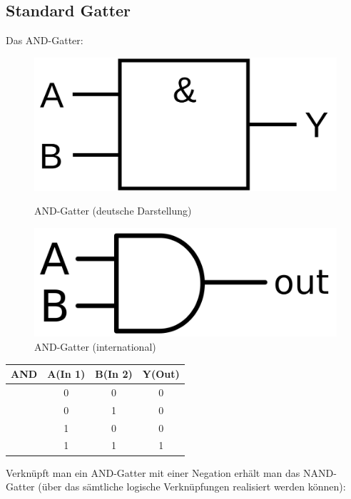 \documentclass[12pt,a4paper]{report}%
\numberwithin{equation}{section}
\numberwithin{equation}{subsection}
\begin{document}
	  \subsection{Standard Gatter}
	  Das AND-Gatter:
	  \begin{figure}[H] 
		\centering
		\begin{minipage}{.5\textwidth}
		  \centering
		  \captionsetup{justification=centering}
		  \includegraphics[width=0.6\linewidth]{AND.png}
		  \caption{AND-Gatter (deutsche Darstellung)}
		  \label{fig:and_de}
		\end{minipage}%
		\begin{minipage}{.5\textwidth}
		  \centering
		  \captionsetup{justification=centering}
		  \includegraphics[width=0.6\linewidth]{AND_int.png}
		  \caption{AND-Gatter (international)}
		  \label{fig:and_int}
		\end{minipage}
  \end{figure}
  \begin{table}[H]
	  \centering
	  \begin{tabular}{c | c c c} 
	    AND & A(In 1) & B(In 2) & Y(Out) \\ \hline
	    $\;$& 0       & 0       & 0 \\   
	    $\;$& 0       & 1       & 0 \\   
	    $\;$& 1       & 0       & 0 \\   
	    $\;$& 1       & 1       & 1 \\   \hline
	  \end{tabular}
  \end{table}
  Verknüpft man ein AND-Gatter mit einer Negation erhält man das NAND-Gatter (über das sämtliche logische Verknüpfungen realisiert werden können):
\end{document}
